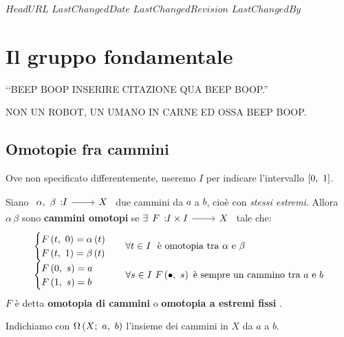 \svnidlong
{$HeadURL$}
{$LastChangedDate$}
{$LastChangedRevision$}
{$LastChangedBy$}

\chapter{Il gruppo fondamentale}

\begin{introduction}
	‘‘BEEP BOOP INSERIRE CITAZIONE QUA BEEP BOOP.''
	\begin{flushright}
		\textsc{NON UN ROBOT,} UN UMANO IN CARNE ED OSSA BEEP BOOP.
	\end{flushright}
\end{introduction}

\section{Omotopie fra cammini}
Ove non specificato differentemente, useremo $I$ per indicare l'intervallo $\left[0,\ 1\right]$.
\begin{define}
	Siano $\funz{\alpha,\ \beta}{I}{X}$ due cammini da $a$ a $b$, cioè con \textit{stessi estremi}. Allora $\alpha\,\beta$ sono \textbf{cammini omotopi} se $\exists \funz{F}{I \times I}{X}$ tale che:
	\begin{equation}
		\begin{array}{ll}
			\begin{cases}
							F\left(t,\ 0\right)=\alpha\left(t\right)\\
				F\left(t,\ 1\right)=\beta\left(t\right)
			\end{cases}&
		\forall t\in I\ \text{ è omotopia tra } \alpha \text{ e }\beta\\
			\begin{cases}
			F\left(0,\ s\right)=a\\
			F\left(1,\ s\right)=b
		\end{cases}&
		\forall s\in I\ F\left(\bullet,\ s\right) \text{ è sempre un cammino tra } a \text{ e }b
		\end{array}
	\end{equation}
$F$ è detta \textbf{omotopia di cammini} o \textbf{omotopia a estremi fissi} .
\end{define}
\begin{define}
	Indichiamo con $\Omega\left(X;\ a,\ b\right)$ l'insieme dei cammini in $X$ da $a$ a $b$.
\end{define}
